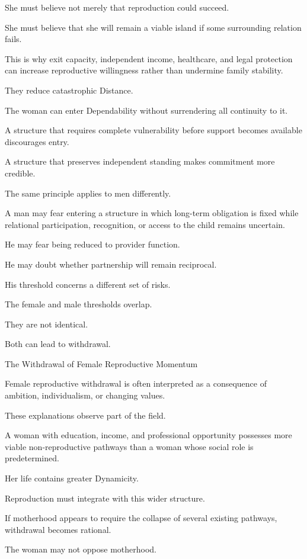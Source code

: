 She must believe not merely that reproduction could succeed.

She must believe that she will remain a viable island if some surrounding relation fails.

This is why exit capacity, independent income, healthcare, and legal protection can increase reproductive willingness rather than undermine family stability.

They reduce catastrophic Distance.

The woman can enter Dependability without surrendering all continuity to it.

A structure that requires complete vulnerability before support becomes available discourages entry.

A structure that preserves independent standing makes commitment more credible.

The same principle applies to men differently.

A man may fear entering a structure in which long-term obligation is fixed while relational participation, recognition, or access to the child remains uncertain.

He may fear being reduced to provider function.

He may doubt whether partnership will remain reciprocal.

His threshold concerns a different set of risks.

The female and male thresholds overlap.

They are not identical.

Both can lead to withdrawal.

The Withdrawal of Female Reproductive Momentum

Female reproductive withdrawal is often interpreted as a consequence of ambition, individualism, or changing values.

These explanations observe part of the field.

A woman with education, income, and professional opportunity possesses more viable non-reproductive pathways than a woman whose social role is predetermined.

Her life contains greater Dynamicity.

Reproduction must integrate with this wider structure.

If motherhood appears to require the collapse of several existing pathways, withdrawal becomes rational.

The woman may not oppose motherhood.

